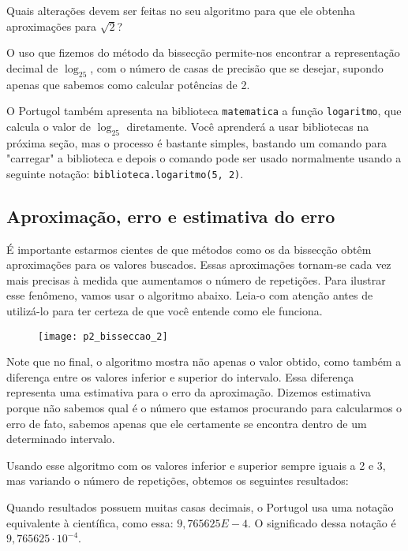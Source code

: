 \begin{reflection}
Quais alterações devem ser feitas no seu algoritmo para que ele obtenha aproximações para $\sqrt{2}$?
\end{reflection}

\label{comp-arr7}

O uso que fizemos do método da bissecção permite-nos encontrar a representação decimal de $\log_25$, com o número de casas de precisão que se desejar, supondo apenas que sabemos como calcular potências de 2.

O Portugol também apresenta na biblioteca \verb|matematica| a função \verb|logaritmo|, que calcula o valor de $\log_25$ diretamente. Você aprenderá a usar bibliotecas na próxima seção, mas o processo é bastante simples, bastando um comando para "carregar" a biblioteca e depois o comando pode ser usado normalmente usando a seguinte notação: \verb|biblioteca.logaritmo(5, 2)|.

\subsection{Aproximação, erro e estimativa do erro}

É importante estarmos cientes de que métodos como os da bissecção obtêm aproximações para os valores buscados. Essas aproximações tornam-se cada vez mais precisas à medida que aumentamos o número de repetições. Para ilustrar esse fenômeno, vamos usar o algoritmo abaixo. Leia-o com atenção antes de utilizá-lo para ter certeza de que você entende como ele funciona.

\begin{figure}[H]
\centering

\texttt{[image: p2\_bisseccao\_2]}
\end{figure}

Note que no final, o algoritmo mostra não apenas o valor obtido, como também a diferença entre os valores inferior e superior do intervalo. Essa diferença representa uma estimativa para o erro da aproximação. Dizemos estimativa porque não sabemos qual é o número que estamos procurando para calcularmos o erro de fato, sabemos apenas que ele certamente se encontra dentro de um determinado intervalo.

Usando esse algoritmo com os valores inferior e superior sempre iguais a 2 e 3, mas variando o número de repetições, obtemos os seguintes resultados:

\begin{texto}
{
	Quando resultados possuem muitas casas decimais, o Portugol usa uma notação equivalente à científica, como essa: $9{,}765625E-4$. O significado dessa notação é $9{,}765625\cdot10^{-4}$.
}
\end{texto}

